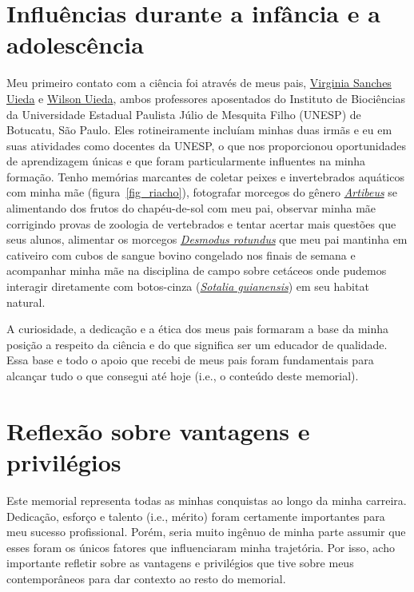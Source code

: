 \documentclass[10pt,a4paper,oneside]{book}
\begin{document}
\section{Influências durante a infância e a adolescência}

Meu primeiro contato com a ciência foi através de meus pais,
\href{https://orcid.org/0000-0002-6078-1342}{Virginia Sanches Uieda} e
\href{https://orcid.org/0000-0002-4177-3339}{Wilson Uieda},
ambos professores aposentados do Instituto de Biociências da Universidade
Estadual Paulista Júlio de Mesquita Filho (UNESP) de Botucatu, São Paulo.
Eles rotineiramente incluíam minhas duas irmãs e eu em suas atividades como
docentes da UNESP, o que nos proporcionou oportunidades de aprendizagem únicas
e que foram particularmente influentes na minha formação.
Tenho memórias marcantes de coletar peixes e invertebrados aquáticos com minha
mãe (figura~\ref{fig_riacho}), fotografar morcegos do gênero
\href{https://pt.wikipedia.org/wiki/Artibeus}{\textit{Artibeus}} se alimentando
dos frutos do chapéu-de-sol com meu pai, observar minha mãe corrigindo provas
de zoologia de vertebrados e tentar acertar mais questões que seus alunos,
alimentar os morcegos
\href{https://pt.wikipedia.org/wiki/Desmodus_rotundus}{\textit{Desmodus rotundus}}
que meu pai mantinha em cativeiro com cubos de sangue bovino congelado nos
finais de semana e acompanhar minha mãe na disciplina de campo sobre cetáceos
onde pudemos interagir diretamente com botos-cinza
(\href{https://pt.wikipedia.org/wiki/Sotalia_guianensis}{\textit{Sotalia guianensis}})
em seu habitat natural.

A curiosidade, a dedicação e a ética dos meus pais formaram a base da minha
posição a respeito da ciência e do que significa ser um educador de qualidade.
Essa base e todo o apoio que recebi de meus pais foram fundamentais para
alcançar tudo o que consegui até hoje (i.e., o conteúdo deste memorial).

\section{Reflexão sobre vantagens e privilégios}

Este memorial representa todas as minhas conquistas ao longo da minha carreira.
Dedicação, esforço e talento (i.e., mérito) foram certamente importantes para
meu sucesso profissional.
Porém, seria muito ingênuo de minha parte assumir que esses foram os únicos
fatores que influenciaram minha trajetória.
Por isso, acho importante refletir sobre as vantagens e privilégios que tive
sobre meus contemporâneos para dar contexto ao resto do memorial.
\end{document}
